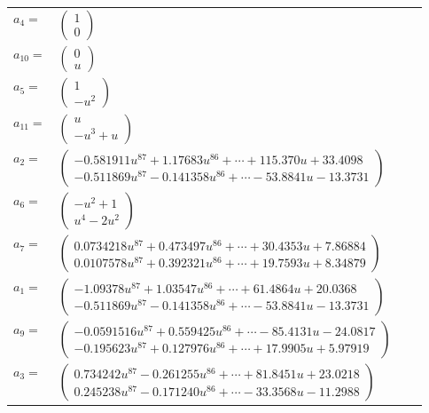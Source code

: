 \documentclass[1p]{elsarticle_modified}
\theoremstyle{definition}
\begin{document}
\begin{tabular}{m{7pt} m{180pt} m{7pt} m{180pt} }
\flushright $a_{4}=$&$\begin{pmatrix}1\\0\end{pmatrix}$ \\
\flushright $a_{10}=$&$\begin{pmatrix}0\\u\end{pmatrix}$ \\
\flushright $a_{5}=$&$\begin{pmatrix}1\\- u^2\end{pmatrix}$ \\
\flushright $a_{11}=$&$\begin{pmatrix}u\\- u^3+u\end{pmatrix}$ \\
\flushright $a_{2}=$&$\begin{pmatrix}-0.581911 u^{87}+1.17683 u^{86}+\cdots+115.370 u+33.4098\\-0.511869 u^{87}-0.141358 u^{86}+\cdots-53.8841 u-13.3731\end{pmatrix}$ \\
\flushright $a_{6}=$&$\begin{pmatrix}- u^2+1\\u^4-2 u^2\end{pmatrix}$ \\
\flushright $a_{7}=$&$\begin{pmatrix}0.0734218 u^{87}+0.473497 u^{86}+\cdots+30.4353 u+7.86884\\0.0107578 u^{87}+0.392321 u^{86}+\cdots+19.7593 u+8.34879\end{pmatrix}$ \\
\flushright $a_{1}=$&$\begin{pmatrix}-1.09378 u^{87}+1.03547 u^{86}+\cdots+61.4864 u+20.0368\\-0.511869 u^{87}-0.141358 u^{86}+\cdots-53.8841 u-13.3731\end{pmatrix}$ \\
\flushright $a_{9}=$&$\begin{pmatrix}-0.0591516 u^{87}+0.559425 u^{86}+\cdots-85.4131 u-24.0817\\-0.195623 u^{87}+0.127976 u^{86}+\cdots+17.9905 u+5.97919\end{pmatrix}$ \\
\flushright $a_{3}=$&$\begin{pmatrix}0.734242 u^{87}-0.261255 u^{86}+\cdots+81.8451 u+23.0218\\0.245238 u^{87}-0.171240 u^{86}+\cdots-33.3568 u-11.2988\end{pmatrix}$ \\

\end{tabular}
\end{document}
